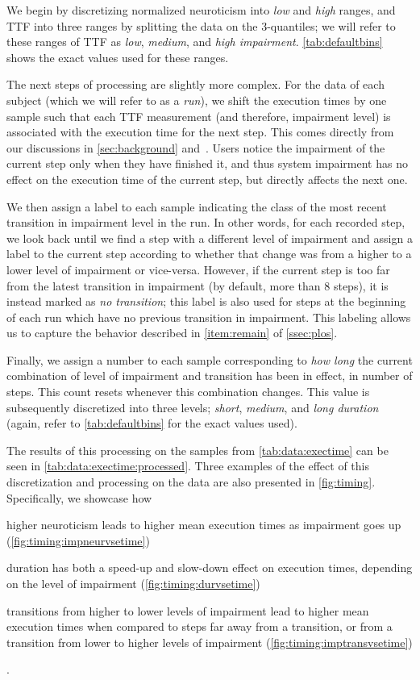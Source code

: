 We begin by discretizing normalized neuroticism into \emph{low} and \emph{high} ranges, and \ac{TTF} into three ranges by splitting the data on the 3-quantiles; we will refer to these ranges of \ac{TTF} as \emph{low}, \emph{medium}, and \emph{high impairment}.
\cref{tab:defaultbins} shows the exact values used for these ranges.

The next steps of processing are slightly more complex.
For the data of each subject (which we will refer to as a \emph{run}), we shift the execution times by one sample such that each \ac{TTF} measurement (and therefore, impairment level) is associated with the execution time for the next step.
This comes directly from our discussions in \cref{sec:background} and~\cite{olguinmunoz:impact2021}.
Users notice the impairment of the current step only when they have finished it, and thus system impairment has no effect on the execution time of the current step, but directly affects the next one.

We then assign a label to each sample indicating the class of the most recent transition in impairment level in the run.
In other words, for each recorded step, we look back until we find a step with a different level of impairment and assign a label to the current step according to whether that change was from a higher to a lower level of impairment or vice-versa.
However, if the current step is too far from the latest transition in impairment (by default, more than \num{8} steps), it is instead marked as \emph{no transition}; this label is also used for steps at the beginning of each run which have no previous transition in impairment.
This labeling allows us to capture the behavior described in \cref{item:remain} of \cref{ssec:plos}.

Finally, we assign a number to each sample corresponding to \emph{how long} the current combination of level of impairment and transition has been in effect, in number of steps.
This count resets whenever this combination changes.
This value is subsequently discretized into three levels; \emph{short}, \emph{medium}, and \emph{long duration} (again, refer to \cref{tab:defaultbins} for the exact values used).

The results of this processing on the samples from \cref{tab:data:exectime} can be seen in \cref{tab:data:exectime:processed}.
Three examples of the effect of this discretization and processing on the data are also presented in \cref{fig:timing}.
Specifically, we showcase how
\begin{enumerate*}[itemjoin={{; }}, itemjoin*={{; and}}]
    \item higher neuroticism leads to higher mean execution times as impairment goes up (\cref{fig:timing:impneurvsetime})
    \item duration has both a speed-up and slow-down effect on execution times, depending on the level of impairment (\cref{fig:timing:durvsetime})
    \item transitions from higher to lower levels of impairment lead to higher mean execution times when compared to steps far away from a transition, or from a transition from lower to higher levels of impairment (\cref{fig:timing:imptransvsetime})
\end{enumerate*}.


